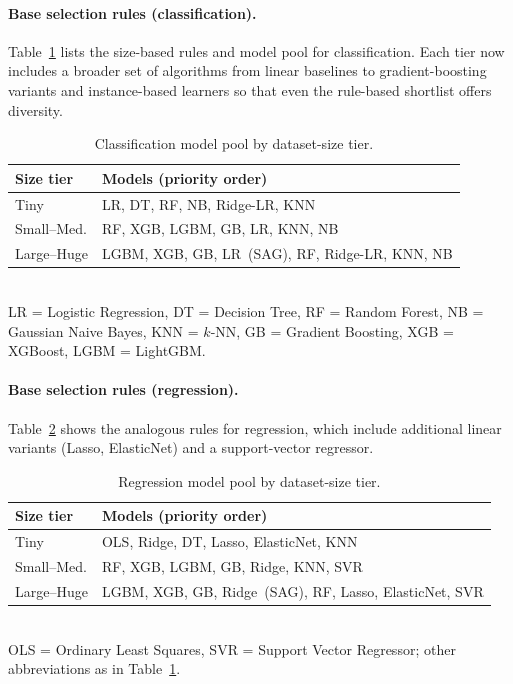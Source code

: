 \documentclass[conference]{llncs}
\begin{document}
   \paragraph{Base selection rules (classification).}
   Table~\ref{tab:cls_rules} lists the size-based rules and model pool for classification.  Each tier now includes a broader set of algorithms from linear baselines to gradient-boosting variants and instance-based learners so that even the rule-based shortlist offers diversity.

   \begin{table}[ht]
   \centering
   \caption{Classification model pool by dataset-size tier.}
   \label{tab:cls_rules}
   \small
   \begin{tabular}{@{}lp{4.7cm}@{}}
   \hline
   \textbf{Size tier} & \textbf{Models (priority order)} \\
   \hline
   Tiny & LR, DT, RF, NB, Ridge-LR, KNN \\
   Small--Med. & RF, XGB, LGBM, GB, LR, KNN, NB \\
   Large--Huge & LGBM, XGB, GB, LR~(SAG), RF, Ridge-LR, KNN, NB \\
   \hline
   \end{tabular}
   \vspace{1mm}
   \\{\scriptsize LR = Logistic Regression, DT = Decision Tree, RF = Random Forest, NB = Gaussian Naive Bayes, KNN = $k$-NN, GB = Gradient Boosting, XGB = XGBoost, LGBM = LightGBM.}
   \end{table}

   \paragraph{Base selection rules (regression).}
   Table~\ref{tab:reg_rules} shows the analogous rules for regression, which include additional linear variants (Lasso, ElasticNet) and a support-vector regressor.

   \begin{table}[ht]
   \centering
   \caption{Regression model pool by dataset-size tier.}
   \label{tab:reg_rules}
   \small
   \begin{tabular}{@{}lp{4.7cm}@{}}
   \hline
   \textbf{Size tier} & \textbf{Models (priority order)} \\
   \hline
   Tiny & OLS, Ridge, DT, Lasso, ElasticNet, KNN \\
   Small--Med. & RF, XGB, LGBM, GB, Ridge, KNN, SVR \\
   Large--Huge & LGBM, XGB, GB, Ridge~(SAG), RF, Lasso, ElasticNet, SVR \\
   \hline
   \end{tabular}
   \vspace{1mm}
   \\{\scriptsize OLS = Ordinary Least Squares, SVR = Support Vector Regressor; other abbreviations as in Table~\ref{tab:cls_rules}.}
   \end{table}
\end{document}
